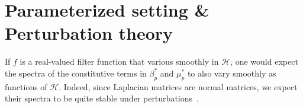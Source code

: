 \documentclass[10pt]{article}
\numberwithin{equation}{section}
\newcommand{\+}{%
	\raisebox{0.18ex}{\scaleobj{0.55}{+}}
}
\newtheorem{corollary}{Corollary}
\theoremstyle{definition}
\begin{document}





\section{Parameterized setting \& Perturbation theory}
If $f$ is a real-valued filter function that various smoothly in $\mathcal{H}$, one would expect the spectra of the constitutive terms in $\beta_p^\ast$ and $\mu_p^\ast$ to also vary smoothly as functions of $\mathcal{H}$.
Indeed, since Laplacian matrices are normal matrices, we expect their spectra to be quite stable under perturbations~\cite{}. 

\end{document}
